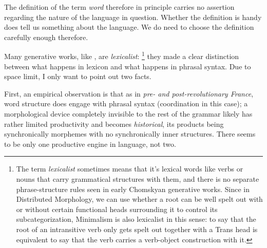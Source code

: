 \documentclass[UTF8, a4paper, oneside, scheme=plain, 12pt]{ctexrep}
\newcommand*{\term}[1]{\emph{#1}}
\newcommand{\form}[1]{\emph{#1}}
\begin{document}
{The definition of the term \term{word} 
therefore in principle carries no assertion regarding 
the nature of the language in question.
Whether the definition is handy does tell us 
something about the language. 
We do need to choose the definition carefully enough therefore. 

Many generative works, like \citet{deng2010formal},
are \emph{lexicalist}:%
\footnote{
    The term \term{lexicalist} sometimes means that  
    it's lexical words like verbs or nouns that carry grammatical structures with them, 
    and there is no separate phrase-structure rules 
    seen in early Chomskyan generative works.
    Since in Distributed Morphology, 
    we can use whether a root can be well spelt out 
    with or without certain functional heads surrounding it 
    to control its subcategorization,
    Minimalism is also lexicalist in this sense:
    to say that the root of an intransitive verb 
    only gets spelt out together with a Trans head 
    is equivalent to say that the verb carries a verb-object construction with it.
} 
they made a clear distinction between what happens in lexicon 
and what happens in phrasal syntax. 
Due to space limit, 
I only want to point out two facts.

First, an empirical observation is that 
as in \form{pre- and post-revolutionary France},
word structure does engage with phrasal syntax (coordination in this case);
a morphological device completely invisible to the rest of the grammar
likely has rather limited productivity and becomes \emph{historical},
its products being synchronically morphemes
with no synchronically inner structures.
There seems to be only one productive engine in language, not two. 

}
\end{document}
